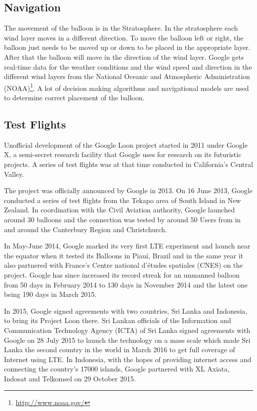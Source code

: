 \documentclass{llncs}
\begin{document}
	\subsection{Navigation}
	The movement of the balloon is in the Stratosphere. In the stratosphere each wind layer moves in a different 
	direction. To move the balloon left or right, the balloon just needs to be moved up or down to be placed in 
	the appropriate layer. After that the balloon will move in the direction of the wind layer. Google gets real-time data for the weather 
	conditions and
	the wind speed and direction in the different wind layers from the National Oceanic and Atmospheric 
	Administration (NOAA)\footnote{\url{http://www.noaa.gov/}}. A lot of decision making algorithms and navigational models are used to 
	determine
	correct placement of the balloon.   
	
	\subsection{Test Flights}
	Unofficial development of the Google Loon project started in 2011 under Google X, a semi-secret
	research facility that Google uses for research on its futuristic projects. A series of test flights
	was at that time conducted in California's Central Valley\cite{google_balloon_x}. 
	
	The project was officially announced by Google in 2013. On 16 June 2013, Google conducted a series
	of test flights from the Tekapo area of South Island in New Zealand\cite{google_balloon_x}. In coordination with the Civil
	Aviation authority, Google launched around 30 balloons and the connection was tested by around
	50 Users from in and around the Canterbury Region and Christchurch.      
	
	In May-June 2014, Google marked its very first LTE experiment and launch near the equator when it
	tested its Balloons in Piau\'{i}, Brazil\cite{google_balloon_brazil} and in the same year it also partnered with France's Centre 
	national d'\'etudes spatiales (CNES)\cite{google_balloon_france} on the project. Google has since increased its record streak 
	for an unmanned balloon from 50 days in February 2014 to 130 days in November 2014 and the latest
	one being 190 days in March 2015\cite{google_balloon_record}. 
	
	In 2015, Google signed agreements with two countries, Sri Lanka and Indonesia, to bring its Project 
	Loon there. Sri Lankan officials of the Information and Communication Technology Agency (ICTA) of Sri 
	Lanka signed agreements with Google on 28 July 2015\cite{google_balloon_srilanka} to launch the technology on a mass scale which made Sri Lanka the 
	second country in the world in March 2016 to get full coverage of Internet using LTE. In Indonesia, 
	with the hopes of providing internet access and connecting the country's 17000 islands, Google partnered with  XL Axiata, Indosat and Telkomsel on 29 October 2015\cite{google_balloon_indonesia}. 
	
\end{document}
